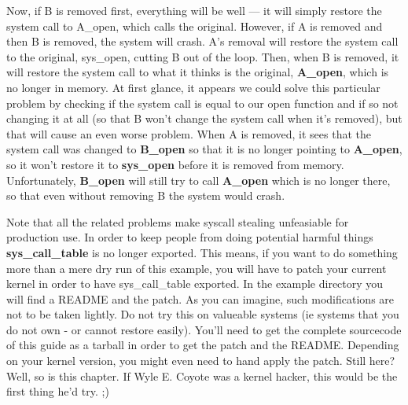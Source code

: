 \documentclass[11pt]{article}
\begin{document}
Now, if B is removed first, everything will be well --- it will simply restore the system call to A\_open, which calls the original. However, if A is removed and then B is removed, the system will crash. A's removal will restore the system call to the original, sys\_open, cutting B out of the loop. Then, when B is removed, it will restore the system call to what it thinks is the original, \textbf{A\_open}, which is no longer in memory. At first glance, it appears we could solve this particular problem by checking if the system call is equal to our open function and if so not changing it at all (so that B won't change the system call when it's removed), but that will cause an even worse problem. When A is removed, it sees that the system call was changed to \textbf{B\_open} so that it is no longer pointing to \textbf{A\_open}, so it won't restore it to \textbf{sys\_open} before it is removed from memory. Unfortunately, \textbf{B\_open} will still try to call \textbf{A\_open} which is no longer there, so that even without removing B the system would crash.

Note that all the related problems make syscall stealing unfeasiable for production use. In order to keep people from doing potential harmful things \textbf{sys\_call\_table} is no longer exported. This means, if you want to do something more than a mere dry run of this example, you will have to patch your current kernel in order to have sys\_call\_table exported. In the example directory you will find a README and the patch. As you can imagine, such modifications are not to be taken lightly. Do not try this on valueable systems (ie systems that you do not own - or cannot restore easily). You'll need to get the complete sourcecode of this guide as a tarball in order to get the patch and the README. Depending on your kernel version, you might even need to hand apply the patch. Still here? Well, so is this chapter. If Wyle E. Coyote was a kernel hacker, this would be the first thing he'd try. ;)
\end{document}
